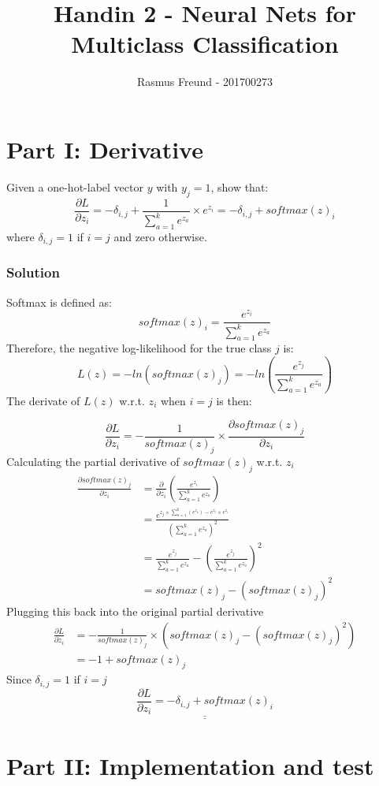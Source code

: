 \documentclass[english,11pt,a4paper,titlepage]{report}
\title{Handin 2 - Neural Nets for Multiclass Classification}
\author{Rasmus Freund - 201700273}
\begin{document}
	\maketitle
	
	\section*{Part I: Derivative}
	Given a one-hot-label vector $y$ with $y_j = 1$, show that:
	\begin{equation*}
	\frac{\partial L}{\partial z_i} = - \delta_{i,j} + \frac{1}{\sum_{a=1}^{k} e^{z_a}} \times e^{z_i} = -\delta_{i,j} + softmax(z)_i
	\end{equation*}
	where $\delta_{i,j} = 1$ if $i=j$ and zero otherwise.
	
	\subsubsection{Solution}
	Softmax is defined as:
	\begin{equation*}
	softmax(z)_i = \frac{e^{z_i}}{\sum_{a=1}^{k} e^{z_a}}
	\end{equation*}
	Therefore, the negative log-likelihood for the true class $j$ is:
	\begin{equation*}
	L(z) = -ln(softmax(z)_j) = -ln \left( \frac{e^{z_j}}{\sum_{a=1}^{k} e^{z_a}} \right)
	\end{equation*}
	The derivate of $L(z)$ w.r.t. $z_i$ when $i=j$ is then:
	
	\begin{equation*}
	\frac{\partial L}{\partial z_i} = -\frac{1}{softmax(z)_j} \times \frac{\partial softmax(z)_j}{\partial z_i}
	\end{equation*}
	Calculating the partial derivative of $softmax(z)_j$ w.r.t. $z_i$
	\begin{align*}
	\frac{\partial softmax(z)_j}{\partial z_i} &= \frac{\partial}{\partial z_i} \left( \frac{e^{z_i}}{\sum_{a=1}^{k} e^{z_a}} \right) \\[7pt]
											   &= \frac{e^{z_j \times \sum_{a=1}^{k} (e^{z_a})-e^{z_j} \times e^{z_i}}}{(\sum_{a=1}^{k} e^{z_a})^2} \\[7pt]
											   &= \frac{e^{z_j}}{\sum_{a=1}^{k} e^{z_a}} - \left( \frac{e^{z_j}}{\sum_{a=1}^{k} e^{z_a}} \right)^2 \\[7pt]
											   &= softmax(z)_j - (softmax(z)_j)^2
	\end{align*}
	Plugging this back into the original partial derivative
	\begin{align*}
	\frac{\partial L}{\partial z_i} &= -\frac{1}{softmax(z)_j} \times (softmax(z)_j - (softmax(z)_j)^2) \\
									&= -1 + softmax(z)_j
	\end{align*}
	Since $\delta_{i,j}=1$ if $i=j$
	\begin{equation*}
	\underline{\underline{\frac{\partial L}{\partial z_i} = -\delta_{i,j} + softmax(z)_i}}
	\end{equation*}
	
	\section*{Part II: Implementation and test}	
\end{document}
